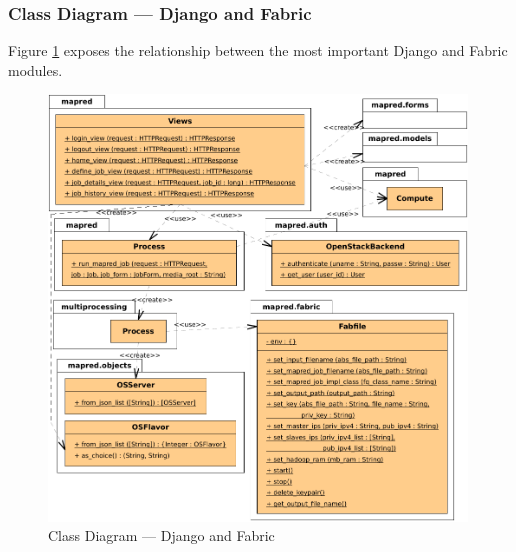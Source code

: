 \subsubsection{Class Diagram --- Django and Fabric}\label{subsubsec:clasesdjangofabric}
\noindent Figure \ref{fig:djangoyfabric} exposes the relationship between the most important Django and Fabric modules.

\begin{figure}[tbp]
\begin{center}
\includegraphics[width=0.99\textwidth]{imagenes/029.pdf}
 \caption{Class Diagram --- Django and Fabric}
\label{fig:djangoyfabric}
\end{center}
\end{figure}

